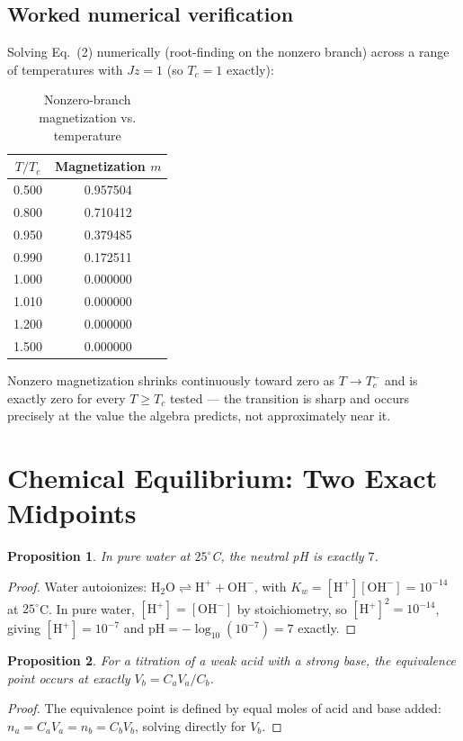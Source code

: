 \documentclass[10pt,journal,compsoc]{IEEEtran}
\newtheorem{proposition}{Proposition}
\begin{document}
\subsection{Worked numerical verification}
Solving Eq.~(2) numerically (root-finding on the nonzero branch) across a range of temperatures with $Jz=1$ (so $T_c=1$ exactly):

\begin{table}[h]
\centering
\caption{Nonzero-branch magnetization vs. temperature}
\begin{tabular}{cc}
\toprule
$T/T_c$ & Magnetization $m$ \\
\midrule
0.500 & 0.957504 \\
0.800 & 0.710412 \\
0.950 & 0.379485 \\
0.990 & 0.172511 \\
1.000 & 0.000000 \\
1.010 & 0.000000 \\
1.200 & 0.000000 \\
1.500 & 0.000000 \\
\bottomrule
\end{tabular}
\end{table}

Nonzero magnetization shrinks continuously toward zero as $T\to T_c^-$ and is exactly zero for every $T\ge T_c$ tested — the transition is sharp and occurs precisely at the value the algebra predicts, not approximately near it.

\section{Chemical Equilibrium: Two Exact Midpoints}
\begin{proposition}
In pure water at $25^\circ$C, the neutral pH is exactly $7$.
\end{proposition}
\begin{proof}
Water autoionizes: $\mathrm{H_2O} \rightleftharpoons \mathrm{H^+}+\mathrm{OH^-}$, with $K_w=[\mathrm{H^+}][\mathrm{OH^-}]=10^{-14}$ at $25^\circ$C. In pure water, $[\mathrm{H^+}]=[\mathrm{OH^-}]$ by stoichiometry, so $[\mathrm{H^+}]^2=10^{-14}$, giving $[\mathrm{H^+}]=10^{-7}$ and $\mathrm{pH}=-\log_{10}(10^{-7})=7$ exactly.
\end{proof}

\begin{proposition}
For a titration of a weak acid with a strong base, the equivalence point occurs at exactly $V_b = C_aV_a/C_b$.
\end{proposition}
\begin{proof}
The equivalence point is defined by equal moles of acid and base added: $n_a=C_aV_a=n_b=C_bV_b$, solving directly for $V_b$.
\end{proof}
\end{document}
